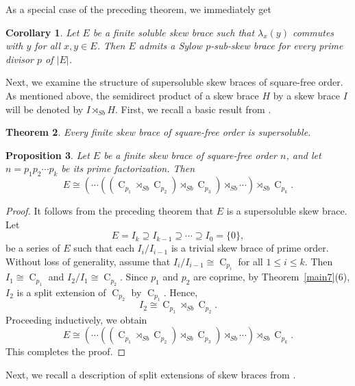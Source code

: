 \documentclass[11pt]{amsart}
\theoremstyle{thrm}
\theoremstyle{plain}
\newtheorem{thm}{Theorem}[section]
\newtheorem{prop}[thm]{Proposition}
\newtheorem{cor}[thm]{Corollary}
\theoremstyle{definition}
\newcommand{\C}{\operatorname{C} }
\numberwithin{equation}{section}
\begin{document}
As a special case of the preceding theorem, we immediately get
\begin{cor}
	Let \( E \) be a finite soluble skew brace  such that $\lambda_x(y)$ commutes with  $y$ for all $x, y \in E$.  Then \( E \)  admits a Sylow $p$-sub-skew brace for every prime divisor $p$ of $|E|$.
\end{cor}



Next, we examine the structure of supersoluble skew braces of square-free order. As mentioned above, the semidirect product of a skew brace $H$ by a skew brace $I$ will be denoted by $I \rtimes_{Sb} H$. 
First, we recall a basic result from  \cite[Corollary 3.9]{BEFPT24}. 
\begin{thm}
	Every finite skew brace of square-free order is supersoluble.
\end{thm}

\begin{prop} \label{solu1}
	Let $E$ be a finite skew brace of square-free order $n$, and let $n = p_1 p_2 \cdots p_k$ be its prime factorization. 
	Then 
	\[
	E \cong (\cdots((\C_{p_1} \rtimes_{Sb} \C_{p_2}) \rtimes_{Sb} \C_{p_3}) \rtimes_{Sb} \cdots) \rtimes_{Sb} \C_{p_k}.
	\]
\end{prop}

\begin{proof}
	It follows from the preceding theorem that $E$ is a supersoluble skew brace.  Let
	\[
	E = I_k \supseteq I_{k-1} \supseteq \cdots \supseteq I_0 = \{0\},
	\]
	be a  series of $E$ such that each $I_{i}/I_{i-1}$  is a trivial skew brace of prime order. Without loss of generality, assume  that $I_{i}/I_{i-1} \cong \C_{p_i}$ for all $1 \leq i \le k$.  Then $I_1 \cong \C_{p_1}$ and $I_2/I_1 \cong \C_{p_2}$. Since $p_1$ and $p_2$ are coprime, by Theorem~\ref{main7}(6), $I_2$ is a split extension of $\C_{p_2}$ by $\C_{p_1}$. Hence,
	\[
	I_2 \cong \C_{p_1} \rtimes_{Sb} \C_{p_2}.
	\]
	Proceeding inductively, we obtain
	\[
	E \cong (\cdots((\C_{p_1} \rtimes_{Sb} \C_{p_2}) \rtimes_{Sb} \C_{p_3}) \rtimes_{Sb} \cdots) \rtimes_{Sb} \C_{p_k}.
	\]
This completes the proof.
\end{proof}

Next, we recall a description of split extensions of skew braces from \cite[Theorem 3.1, Theorem 3.3]{NR24}.
\end{document}
